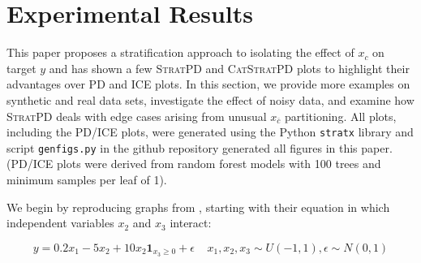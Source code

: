 \documentclass[12pt]{article}
\newcommand{\todo}[1]{{\bf\em TODO:} {{\color{red}{#1}}}}
\newcommand{\spd}{\fontfamily{cmr}\textsc{\small StratPD}}
\newcommand{\cspd}{\fontfamily{cmr}\textsc{\small CatStratPD}}
\newcommand{\xnc}{$x_{\overline{c}}$}
\begin{document}
%
%
%
%
%
 
\section{Experimental Results}\label{sec:applications}

This paper proposes a stratification approach to isolating the effect of $x_c$ on target $y$ and has shown a few \spd{} and \cspd{} plots to highlight their advantages over PD and ICE plots. In this section, we provide more examples on synthetic and real data sets, investigate the effect of noisy data, and examine how \spd{} deals with edge cases arising from unusual \xnc{} partitioning.  All plots, including the PD/ICE plots, were generated using the Python {\tt stratx} library and script {\tt genfigs.py} in the github repository generated all figures in this paper. (PD/ICE plots were derived from random forest models with 100 trees and minimum samples per leaf of 1). 

We begin by reproducing graphs from \cite{ICE}, starting with their equation in which independent variables $x_2$ and $x_3$ interact:

\begin{equation}\label{eq:bigX}
y = 0.2x_1 - 5x_2 + 10x_2\mathbf{1}_{x_3 \geq 0} + \epsilon~~~~~x_1, x_2, x_3 \sim U(-1,1), \epsilon \sim N(0,1)
\end{equation}
\end{document}
